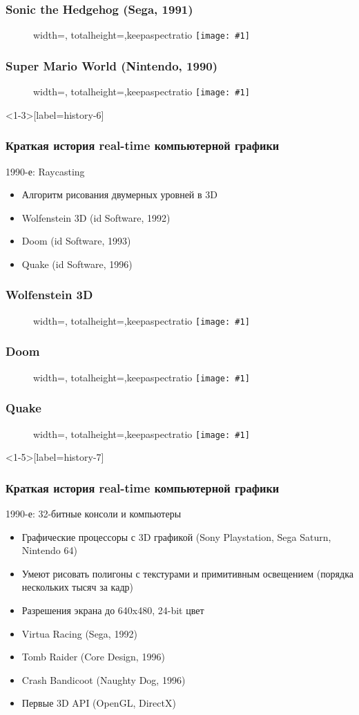 \documentclass{beamer}
\newcommand{\slideimage}[1]{
  \begin{figure}
    \begin{adjustbox}{width=\textwidth, totalheight=\textheight-2\baselineskip-2\baselineskip,keepaspectratio}
      \texttt{[image: \#1]}
    \end{adjustbox}
  \end{figure}
}
\begin{document}
\begin{frame}
\frametitle{Sonic the Hedgehog (Sega, 1991)}
\slideimage{sonic.png}
\end{frame}


\begin{frame}
\frametitle{Super Mario World (Nintendo, 1990)}
\slideimage{super-mario.jpg}
\end{frame}


\begin{frame}<1-3>[label=history-6]
\frametitle{Краткая история real-time компьютерной графики}
\centerline{1990-е: Raycasting}
\pause
\begin{itemize}
\item Алгоритм рисования двумерных уровней в 3D
\pause
\item Wolfenstein 3D (id Software, 1992)
\pause
\item Doom (id Software, 1993)
\pause
\item Quake (id Software, 1996)
\end{itemize}
\end{frame}

\begin{frame}
\frametitle{Wolfenstein 3D}
\slideimage{wolfenstein.png}
\end{frame}


\begin{frame}
\frametitle{Doom}
\slideimage{doom-1993.png}
\end{frame}


\begin{frame}
\frametitle{Quake}
\slideimage{quake.png}
\end{frame}

\begin{frame}<1-5>[label=history-7]
\frametitle{Краткая история real-time компьютерной графики}
\centerline{1990-е: 32-битные консоли и компьютеры}
\pause
\begin{itemize}
\item Графические процессоры с 3D графикой (Sony Playstation, Sega Saturn, Nintendo 64)
\pause
\item Умеют рисовать полигоны с текстурами и примитивным освещением (порядка нескольких тысяч за кадр)
\pause
\item Разрешения экрана до 640x480, 24-bit цвет
\pause
\item Virtua Racing (Sega, 1992)
\pause
\item Tomb Raider (Core Design, 1996)
\pause
\item Crash Bandicoot (Naughty Dog, 1996)
\pause
\item Первые 3D API (OpenGL, DirectX)
\end{itemize}
\end{frame}
\end{document}
